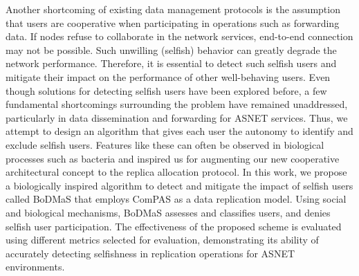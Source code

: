 {Another shortcoming of existing data management protocols is the assumption that users are cooperative when participating in operations such as forwarding data. If nodes refuse to collaborate in the network services, end-to-end connection may not be possible. Such unwilling (selfish) behavior can greatly degrade the network performance. Therefore, it is essential to detect such selfish users and mitigate their impact on the performance of other well-behaving users. Even though solutions for detecting selfish users have been explored before, a few fundamental shortcomings surrounding the problem have remained unaddressed, particularly in data dissemination and forwarding for ASNET services. Thus, we attempt to design an algorithm that gives each user the autonomy to identify and exclude selfish users. Features like these can often be observed in biological processes such as bacteria and inspired us for augmenting our new cooperative architectural concept to the replica allocation protocol. In this work, we propose a biologically inspired algorithm to detect and mitigate the impact of selfish users called BoDMaS that employs ComPAS as a data replication model. Using social and biological mechanisms, BoDMaS assesses and classifies users, and denies selfish user participation. The effectiveness of the proposed scheme is evaluated using different metrics selected for evaluation, demonstrating its ability of accurately detecting selfishness in replication operations for ASNET environments.
}


